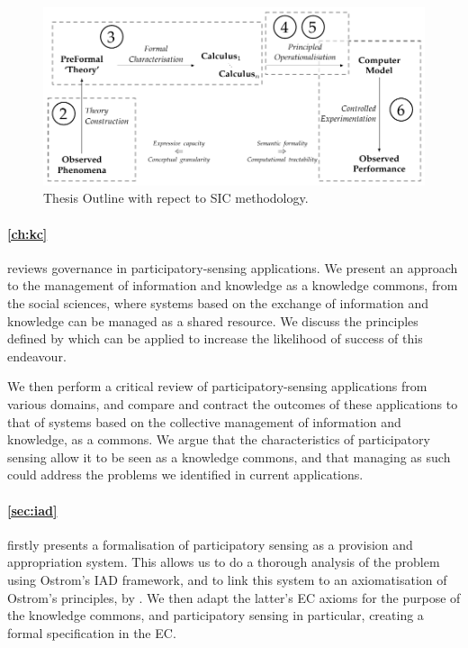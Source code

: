 \begin{figure}
\includegraphics[width=\linewidth]{gfx/intro/sic_chapters}
\caption{Thesis Outline with repect to \acl{SIC} methodology.}\label{fig:sicoutline}
\end{figure}

\paragraph{\autoref{ch:kc}}
reviews governance in participatory-sensing
applications. We present an approach to the management of information and knowledge as a knowledge commons, from
the social sciences, where systems based on the exchange of
information and knowledge can be managed as a shared resource. We discuss the
principles defined by \citet{Ostrom1990} which can be applied to increase the
likelihood of success of this endeavour. 

We then perform a critical review of participatory-sensing applications from
various domains, and compare and contract the outcomes of these applications
to that of systems based on the collective management of information and
knowledge, as a commons. We argue that the characteristics of participatory
sensing allow it to be seen as a knowledge commons, and that managing as such
could address the problems we identified in current applications.

\paragraph{\autoref{sec:iad}}
firstly presents a formalisation of participatory sensing as a provision and
appropriation system. This allows us to do a thorough
analysis of the problem using Ostrom's \ac{IAD} framework, and to link this
system to an axiomatisation of Ostrom's principles, by \citet{Pitt2012b}.
We then adapt the latter's \ac{EC} axioms for the purpose of the
knowledge commons, and participatory sensing in particular, creating a formal specification in the \ac{EC}.


